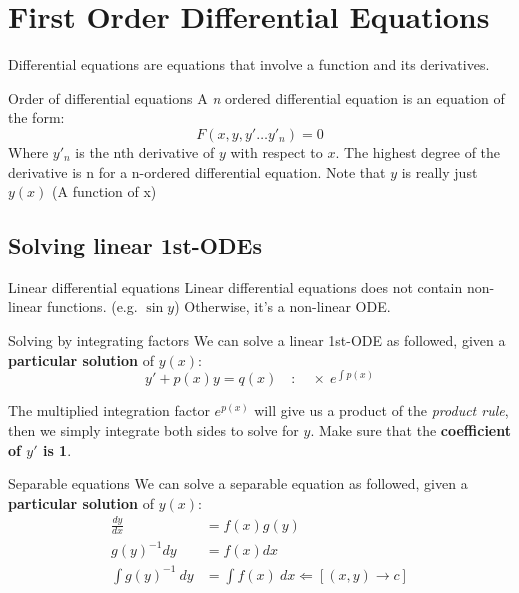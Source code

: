 
\section{First Order Differential Equations}
Differential equations are equations that involve a function and its derivatives.
\begin{definition}
    {Order of differential equations}
    A \emph{n} ordered differential equation is an equation of the form:
    \[F(x,y,y'\dots y'_n)=0\]
    Where $y'_n$ is the nth derivative of $y$ with respect to $x$. The highest degree of the derivative is n for a n-ordered differential equation. Note that $y$ is really just $y(x)$ (A function of x)
\end{definition}

\subsection{Solving linear 1st-ODEs}
\begin{definition}
    {Linear differential equations}
    Linear differential equations does not contain non-linear functions. (e.g. $\sin y$) Otherwise, it's a non-linear ODE.
\end{definition}
\begin{theorem}
    {Solving by integrating factors}
    We can solve a linear 1st-ODE as followed, given a \textbf{particular solution} of $y(x)$:
    \[y'+p(x)y=q(x)\quad : \quad\times\ e^{\int p(x)}\]

    The multiplied integration factor $e^{p(x)}$ will give us a product of the \emph{product rule}, then we simply integrate both sides to solve for $y$. Make sure that the \textbf{coefficient of $y'$ is 1}.
\end{theorem}

\begin{theorem}
    {Separable equations}
    We can solve a separable equation as followed, given a \textbf{particular solution} of $y(x)$:
    \begin{align*}
        \frac{dy}{dx}       & =f(x)g(y)                              \\
        {g(y)}^{-1}dy       & =f(x)dx                                \\
        \int{g(y)}^{-1}\:dy & =\int f(x)\:dx \Leftarrow [(x,y)\to c]
    \end{align*}
\end{theorem}


